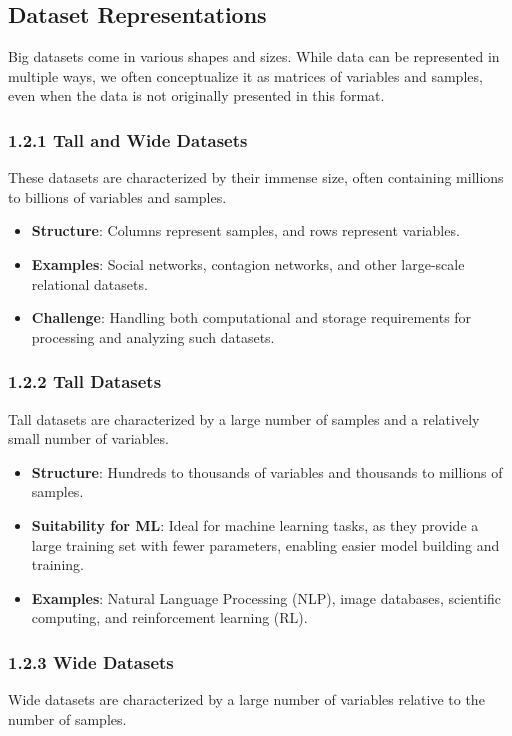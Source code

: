 \documentclass[12pt]{article}
\begin{document}
\subsection{Dataset Representations}
Big datasets come in various shapes and sizes. While data can be represented in multiple ways, we often conceptualize it as matrices of variables and samples, even when the data is not originally presented in this format.

\subsubsection{1.2.1 Tall and Wide Datasets}
These datasets are characterized by their immense size, often containing millions to billions of variables and samples.

\begin{itemize}
    \item \textbf{Structure}: Columns represent samples, and rows represent variables.
    \item \textbf{Examples}: Social networks, contagion networks, and other large-scale relational datasets.
    \item \textbf{Challenge}: Handling both computational and storage requirements for processing and analyzing such datasets.
\end{itemize}

\subsubsection{1.2.2 Tall Datasets}
Tall datasets are characterized by a large number of samples and a relatively small number of variables.

\begin{itemize}
    \item \textbf{Structure}: Hundreds to thousands of variables and thousands to millions of samples.
    \item \textbf{Suitability for ML}: Ideal for machine learning tasks, as they provide a large training set with fewer parameters, enabling easier model building and training.
    \item \textbf{Examples}: Natural Language Processing (NLP), image databases, scientific computing, and reinforcement learning (RL).
\end{itemize}

\subsubsection{1.2.3 Wide Datasets}
Wide datasets are characterized by a large number of variables relative to the number of samples.
\end{document}
